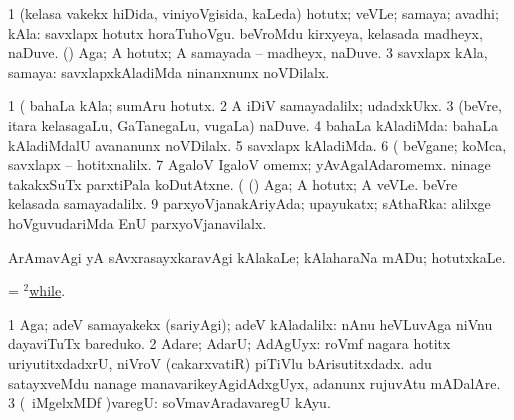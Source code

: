 \bentry
{} 
\gl{\nA}
\expl{}
\bmng
\bnum
\num{1} (kelasa \mo vakekx hiDida, viniyoVgisida, kaLeda) hotutx; veVLe; samaya; avadhi; kAla:  savxlapx hotutx horaTuhoVgu. 
\banum
{} beVroMdu kirxyeya, kelasada madheyx, naDuve. 
 (\kAparx) Aga; A hotutx; A samayada -- madheyx, naDuve. 
\eanum
\numie
\num{3} savxlapx kAla, samaya:  savxlapxkAladiMda ninanxnunx noVDilalx. 
\enum
\emng

\noindent 
\gl{\pagu}
\expl{}
\bmng
\bnum
\num{1}  (  bahaLa kAla; sumAru hotutx. 
\num{2}  A iDiV samayadalilx; udadxkUkx. 
\num{3}  (beVre, itara kelasagaLu, GaTanegaLu, \mo vugaLa) naDuve. 
\num{4}  bahaLa kAladiMda:  bahaLa kAladiMdalU avananunx noVDilalx. 
\num{5}  savxlapx kAladiMda. 
\num{6}  (  beVgane; koMca, savxlapx -- hotitxnalilx. 
\num{7}  AgaloV IgaloV omemx; yAvAgalAdaromemx.  ninage takakxSuTx parxtiPala koDutAtxne. 
  (  
\banum
{} (\kAparx) Aga; A hotutx; A veVLe. 
 beVre kelasada samayadalilx. 
\hypertarget{while(1) pagu(9)}{} 
\eanum
\numie
\num{9}  parxyoVjanakAriyAda; upayukatx; sAthaRka:  alilxge hoVguvudariMda EnU parxyoVjanavilalx. 
\enum
\emng
\eentry

\bentry
{} 
\gl{\sakirx}
\expl{}
\bmng
ArAmavAgi yA sAvxrasayxkaravAgi kAlakaLe; kAlaharaNa mADu; hotutxkaLe. 
\emng

\noindent 
\gl{\pagu}
\expl{}
\bmng
{} = \hyperlink{while(2)}{$^2$while}. 
\emng
\eentry

\bentry
{} 
\gl{\saMavayx}
\bmng
\bnum
\num{1} Aga; adeV samayakekx (sariyAgi); adeV kAladalilx:  nAnu heVLuvAga niVnu dayaviTuTx bareduko. 
\num{2} Adare; AdarU; AdAgUyx:  roVmf nagara hotitx uriyutitxdadxrU, niVroV (cakarxvatiR) piTiVlu bArisutitxdadx.  adu satayxveMdu nanage manavarikeyAgidAdxgUyx, adanunx rujuvAtu mADalAre. 
\num{3} (\kanu\ iMgelxMDf \parx)varegU:  soVmavAradavaregU kAyu. 
\enum
\emng
\eentry

